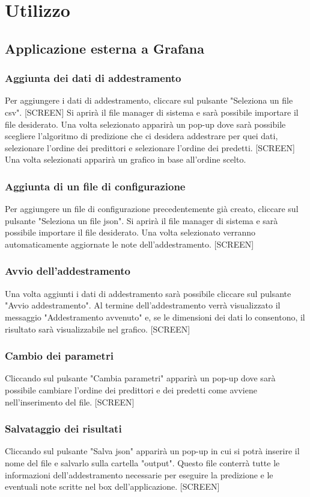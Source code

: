 \section{Utilizzo}
	\subsection{Applicazione esterna a Grafana}
		\subsubsection{Aggiunta dei dati di addestramento}
		Per aggiungere i dati di addestramento, cliccare sul pulsante "Seleziona un file csv".
		[SCREEN]
		Si aprirà il file manager di sistema e sarà possibile importare il file desiderato. Una volta selezionato apparirà un pop-up dove sarà possibile scegliere l'algoritmo di predizione che ci desidera addestrare per quei dati, selezionare l'ordine dei predittori e selezionare l'ordine dei predetti.
		[SCREEN]
		Una volta selezionati apparirà un grafico in base all'ordine scelto.
		\subsubsection{Aggiunta di un file di configurazione}
		Per aggiungere un file di configurazione precedentemente già creato, cliccare sul pulsante "Seleziona un file json".
		Si aprirà il file manager di sistema e sarà possibile importare il file desiderato. Una volta selezionato verranno automaticamente aggiornate le note dell'addestramento.
		[SCREEN]
		\subsubsection{Avvio dell'addestramento}
		Una volta aggiunti i dati di addestramento sarà possibile cliccare sul pulsante "Avvio addestramento". Al termine dell'addestramento verrà visualizzato il messaggio "Addestramento avvenuto" e, se le dimensioni dei dati lo consentono, il risultato sarà visualizzabile nel grafico.
		[SCREEN]
		\subsubsection{Cambio dei parametri}
		Cliccando sul pulsante "Cambia parametri" apparirà un pop-up dove sarà possibile cambiare l'ordine dei predittori e dei predetti come avviene nell'inserimento del file.
		[SCREEN]
		\subsubsection{Salvataggio dei risultati}
		Cliccando sul pulsante "Salva json" apparirà un pop-up in cui si potrà inserire il nome del file e salvarlo sulla cartella "output". Questo file conterrà tutte le informazioni dell'addestramento necessarie per eseguire la predizione e le eventuali note scritte nel box dell'applicazione.
		[SCREEN]
		
